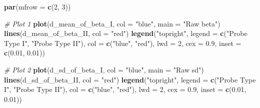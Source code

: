\documentclass[
  11pt,
]{article}
\newenvironment{Shaded}{\begin{snugshade}}{\end{snugshade}}
\newcommand{\AttributeTok}[1]{\textcolor[rgb]{0.13,0.29,0.53}{#1}}
\newcommand{\CommentTok}[1]{\textcolor[rgb]{0.56,0.35,0.01}{\textit{#1}}}
\newcommand{\DecValTok}[1]{\textcolor[rgb]{0.00,0.00,0.81}{#1}}
\newcommand{\FloatTok}[1]{\textcolor[rgb]{0.00,0.00,0.81}{#1}}
\newcommand{\FunctionTok}[1]{\textcolor[rgb]{0.13,0.29,0.53}{\textbf{#1}}}
\newcommand{\NormalTok}[1]{#1}
\newcommand{\StringTok}[1]{\textcolor[rgb]{0.31,0.60,0.02}{#1}}
\begin{document}
\begin{Shaded}
\begin{Highlighting}[]
\FunctionTok{par}\NormalTok{(}\AttributeTok{mfrow =} \FunctionTok{c}\NormalTok{(}\DecValTok{2}\NormalTok{, }\DecValTok{3}\NormalTok{))}

\CommentTok{\# Plot 1}
\FunctionTok{plot}\NormalTok{(d\_mean\_of\_beta\_I, }\AttributeTok{col =} \StringTok{"blue"}\NormalTok{, }\AttributeTok{main =} \StringTok{"Raw beta"}\NormalTok{)}
\FunctionTok{lines}\NormalTok{(d\_mean\_of\_beta\_II, }\AttributeTok{col =} \StringTok{"red"}\NormalTok{)}
\FunctionTok{legend}\NormalTok{(}\StringTok{"topright"}\NormalTok{,}
       \AttributeTok{legend =} \FunctionTok{c}\NormalTok{(}\StringTok{"Probe Type I"}\NormalTok{, }\StringTok{"Probe Type II"}\NormalTok{),}
       \AttributeTok{col =} \FunctionTok{c}\NormalTok{(}\StringTok{"blue"}\NormalTok{, }\StringTok{"red"}\NormalTok{),}
       \AttributeTok{lwd =} \DecValTok{2}\NormalTok{,}
       \AttributeTok{cex =} \FloatTok{0.9}\NormalTok{,}
       \AttributeTok{inset =} \FunctionTok{c}\NormalTok{(}\FloatTok{0.01}\NormalTok{, }\FloatTok{0.01}\NormalTok{))}

\CommentTok{\# Plot 2}
\FunctionTok{plot}\NormalTok{(d\_sd\_of\_beta\_I, }\AttributeTok{col =} \StringTok{"blue"}\NormalTok{, }\AttributeTok{main =} \StringTok{"Raw sd"}\NormalTok{)}
\FunctionTok{lines}\NormalTok{(d\_sd\_of\_beta\_II, }\AttributeTok{col =} \StringTok{"red"}\NormalTok{)}
\FunctionTok{legend}\NormalTok{(}\StringTok{"topright"}\NormalTok{,}
       \AttributeTok{legend =} \FunctionTok{c}\NormalTok{(}\StringTok{"Probe Type I"}\NormalTok{, }\StringTok{"Probe Type II"}\NormalTok{),}
       \AttributeTok{col =} \FunctionTok{c}\NormalTok{(}\StringTok{"blue"}\NormalTok{, }\StringTok{"red"}\NormalTok{),}
       \AttributeTok{lwd =} \DecValTok{2}\NormalTok{,}
       \AttributeTok{cex =} \FloatTok{0.9}\NormalTok{,}
       \AttributeTok{inset =} \FunctionTok{c}\NormalTok{(}\FloatTok{0.01}\NormalTok{, }\FloatTok{0.01}\NormalTok{))}


\end{Highlighting}
\end{Shaded}
\end{document}
